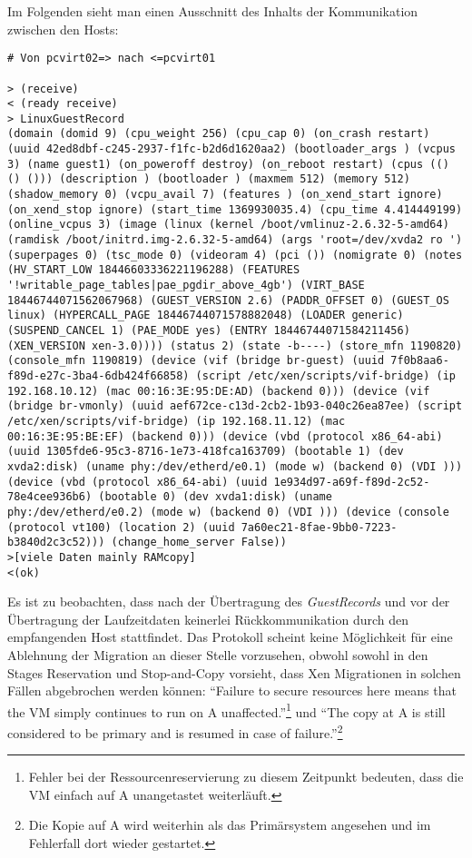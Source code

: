 Im Folgenden sieht man einen Ausschnitt des Inhalts der Kommunikation zwischen den Hosts:
\setupVerbatimOut
\begin{verbatim}
# Von pcvirt02=> nach <=pcvirt01

> (receive)
< (ready receive)
> LinuxGuestRecord
(domain (domid 9) (cpu_weight 256) (cpu_cap 0) (on_crash restart) (uuid 42ed8dbf-c245-2937-f1fc-b2d6d1620aa2) (bootloader_args ) (vcpus 3) (name guest1) (on_poweroff destroy) (on_reboot restart) (cpus (() () ())) (description ) (bootloader ) (maxmem 512) (memory 512) (shadow_memory 0) (vcpu_avail 7) (features ) (on_xend_start ignore) (on_xend_stop ignore) (start_time 1369930035.4) (cpu_time 4.414449199) (online_vcpus 3) (image (linux (kernel /boot/vmlinuz-2.6.32-5-amd64) (ramdisk /boot/initrd.img-2.6.32-5-amd64) (args 'root=/dev/xvda2 ro ') (superpages 0) (tsc_mode 0) (videoram 4) (pci ()) (nomigrate 0) (notes (HV_START_LOW 18446603336221196288) (FEATURES '!writable_page_tables|pae_pgdir_above_4gb') (VIRT_BASE 18446744071562067968) (GUEST_VERSION 2.6) (PADDR_OFFSET 0) (GUEST_OS linux) (HYPERCALL_PAGE 18446744071578882048) (LOADER generic) (SUSPEND_CANCEL 1) (PAE_MODE yes) (ENTRY 18446744071584211456) (XEN_VERSION xen-3.0)))) (status 2) (state -b----) (store_mfn 1190820) (console_mfn 1190819) (device (vif (bridge br-guest) (uuid 7f0b8aa6-f89d-e27c-3ba4-6db424f66858) (script /etc/xen/scripts/vif-bridge) (ip 192.168.10.12) (mac 00:16:3E:95:DE:AD) (backend 0))) (device (vif (bridge br-vmonly) (uuid aef672ce-c13d-2cb2-1b93-040c26ea87ee) (script /etc/xen/scripts/vif-bridge) (ip 192.168.11.12) (mac 00:16:3E:95:BE:EF) (backend 0))) (device (vbd (protocol x86_64-abi) (uuid 1305fde6-95c3-8716-1e73-418fca163709) (bootable 1) (dev xvda2:disk) (uname phy:/dev/etherd/e0.1) (mode w) (backend 0) (VDI ))) (device (vbd (protocol x86_64-abi) (uuid 1e934d97-a69f-f89d-2c52-78e4cee936b6) (bootable 0) (dev xvda1:disk) (uname phy:/dev/etherd/e0.2) (mode w) (backend 0) (VDI ))) (device (console (protocol vt100) (location 2) (uuid 7a60ec21-8fae-9bb0-7223-b3840d2c3c52))) (change_home_server False))
>[viele Daten mainly RAMcopy]
<(ok)
\end{verbatim}
\label{xen_bullshit}
Es ist zu beobachten, dass nach der Übertragung des \emph{GuestRecords} und vor der Übertragung der Laufzeitdaten keinerlei Rückkommunikation durch den empfangenden Host stattfindet. Das Protokoll scheint keine Möglichkeit für eine Ablehnung der Migration an dieser Stelle vorzusehen, obwohl \cite{clark2005live} sowohl in den Stages Reservation und Stop-and-Copy vorsieht, dass Xen Migrationen in solchen Fällen abgebrochen werden können: ``Failure to secure resources here means that the VM simply continues to run on A unaffected.''\footnote{Fehler bei der Ressourcenreservierung zu diesem Zeitpunkt bedeuten, dass die VM einfach auf A unangetastet weiterläuft.}\cite{clark2005live} und ``The copy at A is still considered to be primary and is resumed in case of failure.''\footnote{Die Kopie auf A wird weiterhin als das Primärsystem angesehen und im Fehlerfall dort wieder gestartet.}\cite{clark2005live}


